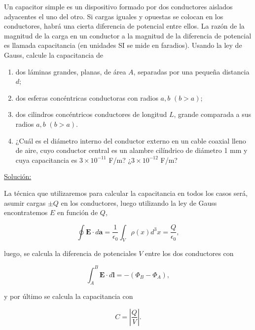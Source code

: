 \documentclass[a4paper,11pt]{article}
\numberwithin{equation}{section}
\begin{document}
Un capacitor simple es un dispositivo formado por dos conductores aislados 
adyacentes el uno del otro. Si cargas iguales y opuestas se colocan en los 
conductores, habrá una cierta diferencia de potencial entre ellos. La razón de 
la magnitud de la carga en un conductor a la magnitud de la diferencia de 
potencial es llamada capacitancia (en unidades SI se mide en faradios). Usando la 
ley de Gauss, calcule la capacitancia de 

\begin{enumerate}[label=\textbf{(\alph*)}]
 \item dos láminas grandes, planas, de área $A$, separadas por una pequeña 
 distancia $d$;
 \item dos esferas concéntricas conductoras con radios $a,b$ $(b > a)$;
 \item dos cilindros concéntricos conductores de longitud $L$, grande comparada 
 a sus radios $a,b$ $(b > a)$.
 \item ¿Cuál es el diámetro interno del conductor externo en un cable coaxial 
 lleno de aire, cuyo conductor central es un alambre cilíndrico de diámetro 
 1 mm y cuya capacitancia es $3\times 10^{-11}$ F/m? ¿$3\times 10^{-12}$ F/m?
\end{enumerate}

\vspace{.3cm}

\underline{Solución:} \vspace{.3cm}

La técnica que utilizaremos para calcular la capacitancia en todos los casos será, 
asumir cargas $\pm Q$ en los conductores, luego utilizando la ley de Gauss encontratemos 
$E$ en función de $Q$, 

\begin{equation}
 \oint \mathbf{E} \cdot d\mathbf{a} = \frac{1}{\epsilon_0}\int_V \rho(x)d^3x = 
 \frac{Q}{\epsilon_0},
\end{equation}

luego, se calcula la diferencia de potenciales $V$ entre los dos conductores con 

\begin{equation}
 \int_A^B \mathbf{E} \cdot d\mathbf{l} = - (\Phi_B - \Phi_A),
\end{equation}

y por último se calcula la capacitancia con 

\begin{equation}
 C = \left|\frac{Q}{V}\right|.
\end{equation}
\end{document}
